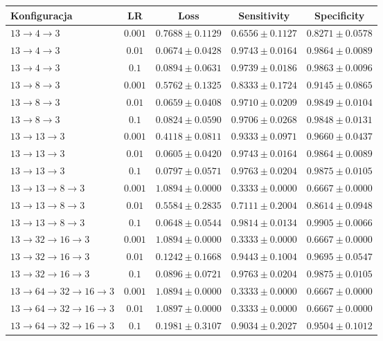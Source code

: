 {\scriptsize
\setlength{\tabcolsep}{4pt}
\begin{tabular}{@{}p{}cccc@{}}
\toprule
Konfiguracja & LR & Loss & Sensitivity & Specificity \\
\midrule
\(13 \rightarrow 4 \rightarrow 3\) & \(0.001\) & \(0.7688 \pm 0.1129\) & \(0.6556 \pm 0.1127\) & \(0.8271 \pm 0.0578\) \\
\(13 \rightarrow 4 \rightarrow 3\) & \(0.01\) & \(0.0674 \pm 0.0428\) & \(0.9743 \pm 0.0164\) & \(0.9864 \pm 0.0089\) \\
\(13 \rightarrow 4 \rightarrow 3\) & \(0.1\) & \(0.0894 \pm 0.0631\) & \(0.9739 \pm 0.0186\) & \(0.9863 \pm 0.0096\) \\
\(13 \rightarrow 8 \rightarrow 3\) & \(0.001\) & \(0.5762 \pm 0.1325\) & \(0.8333 \pm 0.1724\) & \(0.9145 \pm 0.0865\) \\
\(13 \rightarrow 8 \rightarrow 3\) & \(0.01\) & \(0.0659 \pm 0.0408\) & \(0.9710 \pm 0.0209\) & \(0.9849 \pm 0.0104\) \\
\(13 \rightarrow 8 \rightarrow 3\) & \(0.1\) & \(0.0824 \pm 0.0590\) & \(0.9706 \pm 0.0268\) & \(0.9848 \pm 0.0131\) \\
\(13 \rightarrow 13 \rightarrow 3\) & \(0.001\) & \(0.4118 \pm 0.0811\) & \(0.9333 \pm 0.0971\) & \(0.9660 \pm 0.0437\) \\
\(13 \rightarrow 13 \rightarrow 3\) & \(0.01\) & \(0.0605 \pm 0.0420\) & \(0.9743 \pm 0.0164\) & \(0.9864 \pm 0.0089\) \\
\(13 \rightarrow 13 \rightarrow 3\) & \(0.1\) & \(0.0797 \pm 0.0571\) & \(0.9763 \pm 0.0204\) & \(0.9875 \pm 0.0105\) \\
\(13 \rightarrow 13 \rightarrow 8 \rightarrow 3\) & \(0.001\) & \(1.0894 \pm 0.0000\) & \(0.3333 \pm 0.0000\) & \(0.6667 \pm 0.0000\) \\
\(13 \rightarrow 13 \rightarrow 8 \rightarrow 3\) & \(0.01\) & \(0.5584 \pm 0.2835\) & \(0.7111 \pm 0.2004\) & \(0.8614 \pm 0.0948\) \\
\(13 \rightarrow 13 \rightarrow 8 \rightarrow 3\) & \(0.1\) & \(0.0648 \pm 0.0544\) & \(0.9814 \pm 0.0134\) & \(0.9905 \pm 0.0066\) \\
\(13 \rightarrow 32 \rightarrow 16 \rightarrow 3\) & \(0.001\) & \(1.0894 \pm 0.0000\) & \(0.3333 \pm 0.0000\) & \(0.6667 \pm 0.0000\) \\
\(13 \rightarrow 32 \rightarrow 16 \rightarrow 3\) & \(0.01\) & \(0.1242 \pm 0.1668\) & \(0.9443 \pm 0.1004\) & \(0.9695 \pm 0.0547\) \\
\(13 \rightarrow 32 \rightarrow 16 \rightarrow 3\) & \(0.1\) & \(0.0896 \pm 0.0721\) & \(0.9763 \pm 0.0204\) & \(0.9875 \pm 0.0105\) \\
\(13 \rightarrow 64 \rightarrow 32 \rightarrow 16 \rightarrow 3\) & \(0.001\) & \(1.0894 \pm 0.0000\) & \(0.3333 \pm 0.0000\) & \(0.6667 \pm 0.0000\) \\
\(13 \rightarrow 64 \rightarrow 32 \rightarrow 16 \rightarrow 3\) & \(0.01\) & \(1.0897 \pm 0.0000\) & \(0.3333 \pm 0.0000\) & \(0.6667 \pm 0.0000\) \\
\(13 \rightarrow 64 \rightarrow 32 \rightarrow 16 \rightarrow 3\) & \(0.1\) & \(0.1981 \pm 0.3107\) & \(0.9034 \pm 0.2027\) & \(0.9504 \pm 0.1012\) \\
\bottomrule
\end{tabular}
}
